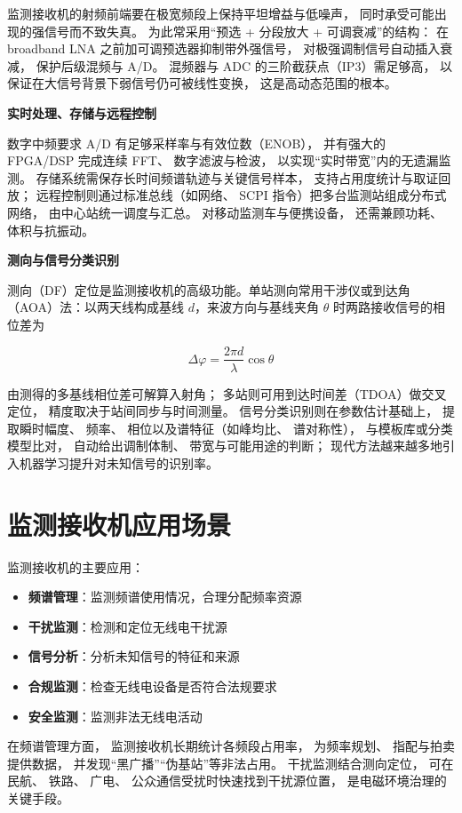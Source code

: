 监测接收机的射频前端要在极宽频段上保持平坦增益与低噪声，
同时承受可能出现的强信号而不致失真。
为此常采用“预选 + 分段放大 + 可调衰减”的结构：
在 broadband LNA 之前加可调预选器抑制带外强信号，
对极强调制信号自动插入衰减，
保护后级混频与 A/D。
混频器与 ADC 的三阶截获点（IP3）需足够高，
以保证在大信号背景下弱信号仍可被线性变换，
这是高动态范围的根本。

\medskip\noindent\textbf{实时处理、存储与远程控制}

数字中频要求 A/D 有足够采样率与有效位数（ENOB），
并有强大的 FPGA/DSP 完成连续 FFT、
数字滤波与检波，
以实现“实时带宽”内的无遗漏监测。
存储系统需保存长时间频谱轨迹与关键信号样本，
支持占用度统计与取证回放；
远程控制则通过标准总线（如网络、
SCPI 指令）把多台监测站组成分布式网络，
由中心站统一调度与汇总。
对移动监测车与便携设备，
还需兼顾功耗、
体积与抗振动。

\medskip\noindent\textbf{测向与信号分类识别}

测向（DF）定位是监测接收机的高级功能。单站测向常用干涉仪或到达角（AOA）法：以两天线构成基线 $d$，来波方向与基线夹角 $\theta$ 时两路接收信号的相位差为

\[
\Delta\varphi=\frac{2\pi d}{\lambda}\cos\theta
\]

由测得的多基线相位差可解算入射角；
多站则可用到达时间差（TDOA）做交叉定位，
精度取决于站间同步与时间测量。
信号分类识别则在参数估计基础上，
提取瞬时幅度、
频率、
相位以及谱特征（如峰均比、
谱对称性），
与模板库或分类模型比对，
自动给出调制体制、
带宽与可能用途的判断；
现代方法越来越多地引入机器学习提升对未知信号的识别率。

\section{监测接收机应用场景}
\label{sec:monitoring_applications}

监测接收机的主要应用：

\begin{itemize}
    \item \textbf{频谱管理}：监测频谱使用情况，合理分配频率资源
    \item \textbf{干扰监测}：检测和定位无线电干扰源
    \item \textbf{信号分析}：分析未知信号的特征和来源
    \item \textbf{合规监测}：检查无线电设备是否符合法规要求
    \item \textbf{安全监测}：监测非法无线电活动
\end{itemize}

在频谱管理方面，
监测接收机长期统计各频段占用率，
为频率规划、
指配与拍卖提供数据，
并发现“黑广播”“伪基站”等非法占用。
干扰监测结合测向定位，
可在民航、
铁路、
广电、
公众通信受扰时快速找到干扰源位置，
是电磁环境治理的关键手段。

